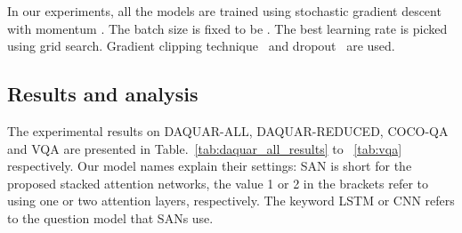 \documentclass[10pt,twocolumn,letterpaper]{article}
\begin{document}
In our experiments, all the models are trained using stochastic gradient
descent with momentum . The batch size is fixed to be . The best
learning rate is picked using grid search. Gradient clipping
technique~\cite{graves2013generating} and dropout~\cite{srivastava2014dropout}
are used.

\subsection{Results and analysis }
The experimental results on DAQUAR-ALL, DAQUAR-REDUCED, COCO-QA and VQA are
presented in Table.~\ref{tab:daquar_all_results} to ~\ref{tab:vqa}
respectively. Our model names explain their settings: SAN is short for the
proposed stacked attention networks, the value 1 or 2 in the brackets refer to
using one or two attention layers, respectively. The keyword LSTM or CNN refers
to the question model that SANs use.
\end{document}
